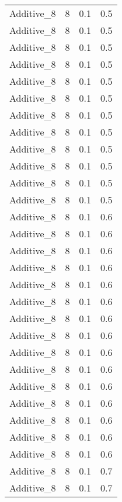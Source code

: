\documentclass{article}
\begin{document}
\begin{longtable}[H]{lrrr}
 Additive\_8 &       8 &   0.1 &            0.5 \\
 Additive\_8 &       8 &   0.1 &            0.5 \\
 Additive\_8 &       8 &   0.1 &            0.5 \\
 Additive\_8 &       8 &   0.1 &            0.5 \\
 Additive\_8 &       8 &   0.1 &            0.5 \\
 Additive\_8 &       8 &   0.1 &            0.5 \\
 Additive\_8 &       8 &   0.1 &            0.5 \\
 Additive\_8 &       8 &   0.1 &            0.5 \\
 Additive\_8 &       8 &   0.1 &            0.5 \\
 Additive\_8 &       8 &   0.1 &            0.5 \\
 Additive\_8 &       8 &   0.1 &            0.5 \\
 Additive\_8 &       8 &   0.1 &            0.5 \\
 Additive\_8 &       8 &   0.1 &            0.6 \\
 Additive\_8 &       8 &   0.1 &            0.6 \\
 Additive\_8 &       8 &   0.1 &            0.6 \\
 Additive\_8 &       8 &   0.1 &            0.6 \\
 Additive\_8 &       8 &   0.1 &            0.6 \\
 Additive\_8 &       8 &   0.1 &            0.6 \\
 Additive\_8 &       8 &   0.1 &            0.6 \\
 Additive\_8 &       8 &   0.1 &            0.6 \\
 Additive\_8 &       8 &   0.1 &            0.6 \\
 Additive\_8 &       8 &   0.1 &            0.6 \\
 Additive\_8 &       8 &   0.1 &            0.6 \\
 Additive\_8 &       8 &   0.1 &            0.6 \\
 Additive\_8 &       8 &   0.1 &            0.6 \\
 Additive\_8 &       8 &   0.1 &            0.6 \\
 Additive\_8 &       8 &   0.1 &            0.6 \\
 Additive\_8 &       8 &   0.1 &            0.7 \\
 Additive\_8 &       8 &   0.1 &            0.7 \\

\end{longtable}
\end{document}
